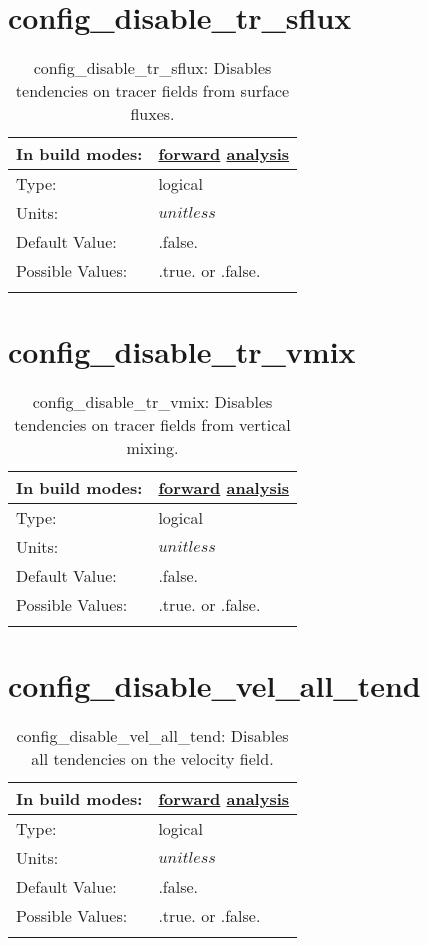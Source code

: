 \section[config\_disable\_tr\_sflux]{config\_disable\_tr\_sflux}
\label{sec:nm_sec_config_disable_tr_sflux}
\begin{center}
\begin{longtable}{| p{2.0in} || p{4.0in} |}
    \hline
    In build modes: & \hyperref[subsec:forward_nm_tab_debug]{forward} \hyperref[subsec:analysis_nm_tab_debug]{analysis} \\
    \hline
    Type: & logical \\
    \hline
    Units: & $unitless$ \\
    \hline
    Default Value: & .false. \\
    \hline
    Possible Values: & .true. or .false. \\
    \hline
    \caption{config\_disable\_tr\_sflux: Disables tendencies on tracer fields from surface fluxes.}
\end{longtable}
\end{center}
\section[config\_disable\_tr\_vmix]{config\_disable\_tr\_vmix}
\label{sec:nm_sec_config_disable_tr_vmix}
\begin{center}
\begin{longtable}{| p{2.0in} || p{4.0in} |}
    \hline
    In build modes: & \hyperref[subsec:forward_nm_tab_debug]{forward} \hyperref[subsec:analysis_nm_tab_debug]{analysis} \\
    \hline
    Type: & logical \\
    \hline
    Units: & $unitless$ \\
    \hline
    Default Value: & .false. \\
    \hline
    Possible Values: & .true. or .false. \\
    \hline
    \caption{config\_disable\_tr\_vmix: Disables tendencies on tracer fields from vertical mixing.}
\end{longtable}
\end{center}
\section[config\_disable\_vel\_all\_tend]{config\_disable\_vel\_all\_tend}
\label{sec:nm_sec_config_disable_vel_all_tend}
\begin{center}
\begin{longtable}{| p{2.0in} || p{4.0in} |}
    \hline
    In build modes: & \hyperref[subsec:forward_nm_tab_debug]{forward} \hyperref[subsec:analysis_nm_tab_debug]{analysis} \\
    \hline
    Type: & logical \\
    \hline
    Units: & $unitless$ \\
    \hline
    Default Value: & .false. \\
    \hline
    Possible Values: & .true. or .false. \\
    \hline
    \caption{config\_disable\_vel\_all\_tend: Disables all tendencies on the velocity field.}
\end{longtable}
\end{center}
